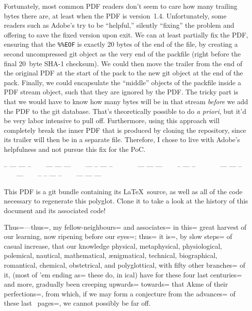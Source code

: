 \documentclass{article}
\def\thindivider{\centerline{\tiny%
-- --- --- -- ~~~ --- --- --- ~~~ --- -- --- -- ~~~~~~
--- --- --- ~~~  -- --- -- ~~~~~~
--- --- -- ~~~ --- ~~~ -- -- --- -- ~~~ --- --- ---}}
\begin{document}
Fortunately, most common PDF readers don't seem to care how many
trailing bytes there are, at least when the PDF is version~1.4.
Unfortunately, some readers such as Adobe's try to be ``helpful,''
silently ``fixing'' the problem and offering to save the fixed version
upon exit.  We can at least partially fix the PDF, ensuring that
the \texttt{\%\%EOF} is exactly 20 bytes of the end of the file, by
creating a second uncompressed git object as the very end of the
packfile (right before the final 20~byte SHA-1 checksum).  We could
then move the trailer from the end of the original PDF at the start of
the pack to the new git object at the end of the pack.  Finally, we
could encapsulate the ``middle'' objects of the packfile inside a PDF
stream object, such that they are ignored by the PDF.  The tricky part
is that we would have to know how many bytes will be in that
stream \emph{before} we add the PDF to the git database.  That's
theoretically possible to do \textit{a priori}, but it'd be very labor
intensive to pull off.  Furthermore, using this approach will
completely break the inner PDF that is produced by cloning the
repository, since its trailer will then be in a separate file.
Therefore, I chose to live with Adobe's helpfulness and not pursue
this fix for the PoC.

\thindivider

This PDF is a git bundle containing its \LaTeX\ source, as well as all
of the code necessary to regenerate this polyglot. Clone it to take a
look at the history of this document and its associated code!

{\selectfont\begin{center}
\begin{minipage}{0.8\hsize}\small
Thus=---thus=, my fellow-neighbours= and associates= in this= great harvest of our learning, now ripening before our eyes=; thus= it is=, by slow steps= of casual increase, that our knowledge physical, metaphysical, physiological, polemical, nautical, mathematical, \ae{}nigmatical, technical, biographical, romantical, chemical, obstetrical, and polyglottical, with fifty other branches= of it, (most of 'em ending as= these do, in ical) have for these four last centuries= and more, gradually been creeping upwards= towards= that Akme of their perfections=, from which, if we may form a conjecture from the advances= of these last \thepage~pages=, we cannot possibly be far off.
\end{minipage}
\end{center}}
\end{document}
